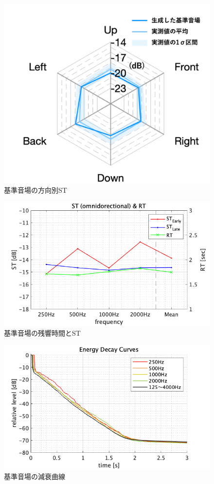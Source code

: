 \documentclass[11pt,a4j]{jreport}
\begin{document}
\begin{figure}[H]
\begin{minipage}
      \includegraphics[width=1\linewidth]{images/experimentField/withLegend/baseLateOnTarget4.png}
      \end{minipage}
    \caption{基準音場の方向別ST}
    \label{fig:基準音場の方向別ST}
  \end{figure}

  \begin{figure}[H]
    \centering
    \includegraphics[width=.8\linewidth]{images/fieldO_stRt.png}
    \caption{基準音場の残響時間とST}
    \label{fig:基準音場の残響時間とST}
  \end{figure}

  \begin{figure}[H]
    \centering
    \includegraphics[width=.8\linewidth]{images/fieldO_EnergyDecayCurve.png}
    \caption{基準音場の減衰曲線}
    \label{fig:基準音場の減衰曲線}
  \end{figure}
\end{document}
